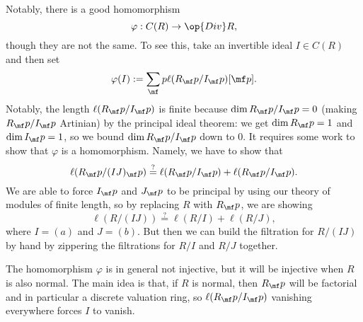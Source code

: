 \documentclass[../notes.tex]{subfiles}
\begin{document}
Notably, there is a good homomorphism
\[\varphi:C(R)\to\op{Div}R,\]
though they are not the same. To see this, take an invertible ideal $I\in C(R)$ and then set
\[\varphi(I):=\sum_\mf p\ell(R_\mf p/I_\mf p)[\mf p].\]
Notably, the length $\ell(R_\mf p/I_\mf p)$ is finite because $\dim R_\mf p/I_\mf p=0$ (making $R_\mf p/I_\mf p$ Artinian) by the principal ideal theorem: we get $\dim R_\mf p=1$ and $\dim I_\mf p=1$, so we bound $\dim R_\mf p/I_\mf p$ down to $0$. It requires some work to show that $\varphi$ is a homomorphism. Namely, we have to show that
\[\ell(R_\mf p/(IJ)_\mf p)\stackrel?=\ell(R_\mf p/I_\mf p)+\ell(R_\mf p/I_\mf p).\]
We are able to force $I_\mf p$ and $J_\mf p$ to be principal by using our theory of modules of finite length, so by replacing $R$ with $R_\mf p$, we are showing
\[\ell(R/(IJ))\stackrel?=\ell(R/I)+\ell(R/J),\]
where $I=(a)$ and $J=(b)$. But then we can build the filtration for $R/(IJ)$ by hand by zippering the filtrations for $R/I$ and $R/J$ together.
\begin{remark}
	The homomorphism $\varphi$ is in general not injective, but it will be injective when $R$ is also normal. The main idea is that, if $R$ is normal, then $R_\mf p$ will be factorial and in particular a discrete valuation ring, so $\ell(R_\mf p/I_\mf p)$ vanishing everywhere forces $I$ to vanish.
\end{remark}
\end{document}
